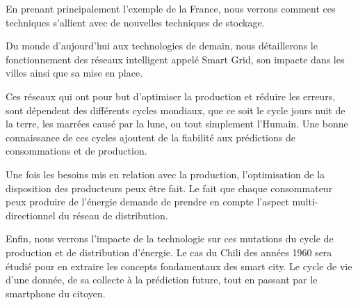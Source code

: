 En prenant principalement l'exemple de la France, nous verrons comment ces techniques s'allient avec
de nouvelles techniques de stockage.

Du monde d'aujourd'hui aux technologies de demain, nous détaillerons le fonctionnement des réseaux intelligent
appelé Smart Grid, son impacte dans les villes ainsi que sa mise en place.

Ces réseaux qui ont pour but d'optimiser la production et réduire les erreurs, sont dépendent des différents cycles
mondiaux, que ce soit le cycle jours nuit de la terre, les marrées causé par la lune, ou tout simplement l'Humain.
Une bonne connaissance de ces cycles ajoutent de la fiabilité aux prédictions de consommations et de production.

Une fois les besoins mis en relation avec la production, l'optimisation de la disposition
des producteurs peux être fait.
Le fait que chaque consommateur peux produire de l'énergie demande de prendre en compte l'aspect
multi-directionnel du réseau de distribution.

Enfin, nous verrons l'impacte de la technologie sur ces mutations du cycle de production et de distribution d'énergie.
Le cas du Chili des années 1960 sera étudié pour en extraire les concepts fondamentaux des smart city.
Le cycle de vie d'une donnée, de sa collecte à la prédiction future, tout en passant par le smartphone du citoyen.
